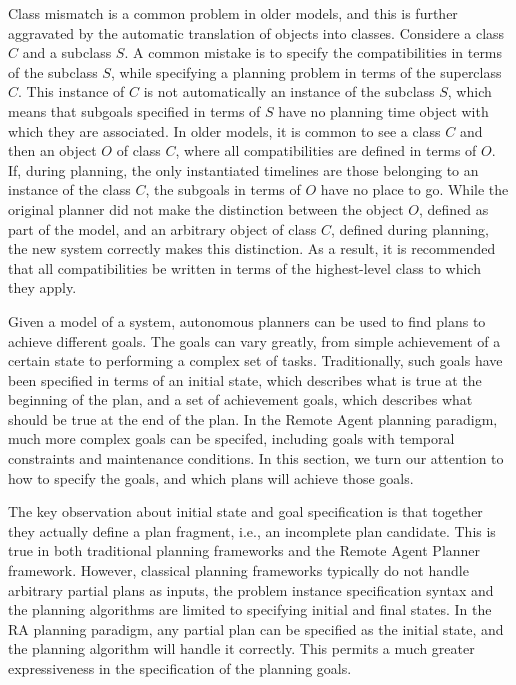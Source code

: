 Class mismatch is a common problem in older models, and this is
further aggravated by the automatic translation of objects into
classes.  Considere a class $C$ and a subclass $S$.  A common mistake
is to specify the compatibilities in terms of the subclass $S$, while
specifying a planning problem in terms of the superclass $C$.  This
instance of $C$ is not automatically an instance of the subclass $S$,
which means that subgoals specified in terms of $S$ have no planning
time object with which they are associated.  In older models, it is
common to see a class $C$ and then an object $O$ of class $C$, where
all compatibilities are defined in terms of $O$.  If, during planning,
the only instantiated timelines are those belonging to an instance of
the class $C$, the subgoals in terms of $O$ have no place to go. 
While the original planner did not make the distinction between the
object $O$, defined as part of the model, and an arbitrary object of
class $C$, defined during planning, the new system correctly makes
this distinction.  As a result, it is recommended that all
compatibilities be written in terms of the highest-level class to
which they apply.






Given a model of a system, autonomous planners can be used to find
plans to achieve different goals.  The goals can vary greatly, from
simple achievement of a certain state to performing a complex set of
tasks.  Traditionally, such goals have been specified in terms of an
initial state, which describes what is true at the beginning of the
plan, and a set of achievement goals, which describes what should be
true at the end of the plan.  In the Remote Agent planning paradigm,
much more complex goals can be specifed, including goals with temporal
constraints and maintenance conditions.  In this section, we turn our
attention to how to specify the goals, and which plans will achieve
those goals.



The key observation about initial state and goal specification is that
together they actually define a plan fragment, i.e., an incomplete
plan candidate.  This is true in both traditional planning frameworks
and the Remote Agent Planner framework.  However, classical planning
frameworks typically do not handle arbitrary partial plans as inputs,
the problem instance specification syntax and the planning algorithms
are limited to specifying initial and final states.  In the RA
planning paradigm, any partial plan can be specified as the initial
state, and the planning algorithm will handle it correctly.  This
permits a much greater expressiveness in the specification of the
planning goals.

